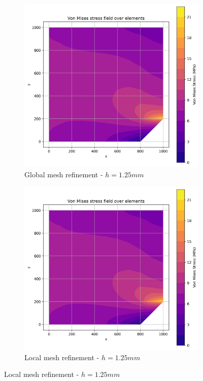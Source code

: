 \begin{figure}[H]
  \centering
  \begin{subfigure}[b]{0.45\textwidth}
    \centering
    \includegraphics[width=\textwidth]{GRAFICOS/Quad9/1.25mm_global/resultados_von_mises.png}
    \caption{Global mesh refinement - $h=1.25mm$}
    \label{fig:img13}
  \end{subfigure}
  \hfill
  \begin{subfigure}[b]{0.45\textwidth}
    \centering
    \includegraphics[width=\textwidth]{GRAFICOS/Quad9/1.25mm_global/resultados_von_mises.png}
    \caption{Local mesh refinement - $h=1.25mm$}
    \label{fig:img23}
  \end{subfigure}
\end{figure}

